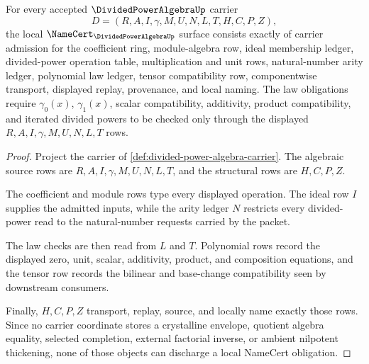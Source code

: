 \begin{theorem}
\label{thm:divided-power-algebra-namecert-obligations}
For every accepted $\DividedPowerAlgebraUp$ carrier
$$
D=(R,A,I,\gamma,M,U,N,L,T,H,C,P,Z),
$$
the local $\NameCert_{\DividedPowerAlgebraUp}$ surface consists exactly of carrier admission for the coefficient ring, module-algebra row, ideal membership ledger, divided-power operation table, multiplication and unit rows, natural-number arity ledger, polynomial law ledger, tensor compatibility row, componentwise transport, displayed replay, provenance, and local naming. The law obligations require $\gamma_0(x)$, $\gamma_1(x)$, scalar compatibility, additivity, product compatibility, and iterated divided powers to be checked only through the displayed $R,A,I,\gamma,M,U,N,L,T$ rows.
\end{theorem}
\begin{proof}
Project the carrier of \autoref{def:divided-power-algebra-carrier}. The algebraic source rows are $R,A,I,\gamma,M,U,N,L,T$, and the structural rows are $H,C,P,Z$.

The coefficient and module rows type every displayed operation. The ideal row $I$ supplies the admitted inputs, while the arity ledger $N$ restricts every divided-power read to the natural-number requests carried by the packet.

The law checks are then read from $L$ and $T$. Polynomial rows record the displayed zero, unit, scalar, additivity, product, and composition equations, and the tensor row records the bilinear and base-change compatibility seen by downstream consumers.

Finally, $H,C,P,Z$ transport, replay, source, and locally name exactly those rows. Since no carrier coordinate stores a crystalline envelope, quotient algebra equality, selected completion, external factorial inverse, or ambient nilpotent thickening, none of those objects can discharge a local NameCert obligation.
\end{proof}

